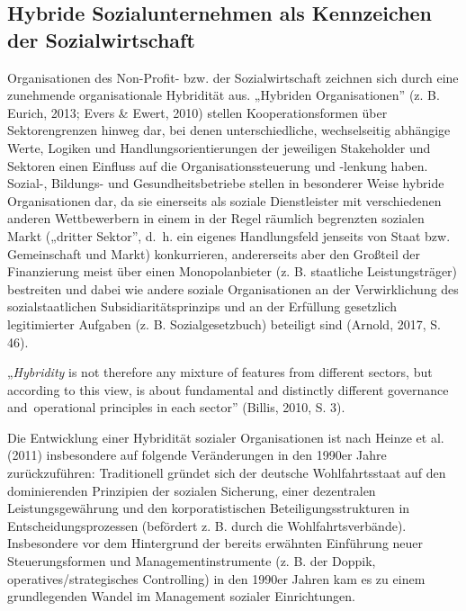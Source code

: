 \documentclass[
  letterpaper,
]{book}
\begin{document}
\subsection{Hybride Sozialunternehmen als Kennzeichen der
Sozialwirtschaft}\label{hybride-sozialunternehmen}

Organisationen des Non-Profit- bzw. der Sozialwirtschaft zeichnen sich
durch eine zunehmende organisationale Hybridität aus. „Hybriden
Organisationen'' (z. B. Eurich, 2013; Evers \& Ewert, 2010) stellen
Kooperationsformen über Sektorengrenzen hinweg dar, bei denen
unterschiedliche, wechselseitig abhängige Werte, Logiken und
Handlungsorientierungen der jeweiligen Stakeholder und Sektoren einen
Einfluss auf die Organisationssteuerung und -lenkung haben. Sozial-,
Bildungs- und Gesundheitsbetriebe stellen in besonderer Weise hybride
Organisationen dar, da sie einerseits als soziale Dienstleister mit
verschiedenen anderen Wettbewerbern in einem in der Regel räumlich
begrenzten sozialen Markt („dritter Sektor'', d.~h. ein eigenes
Handlungsfeld jenseits von Staat bzw. Gemeinschaft und Markt)
konkurrieren, andererseits aber den Großteil der Finanzierung meist über
einen Monopolanbieter (z. B. staatliche Leistungsträger) bestreiten und
dabei wie andere soziale Organisationen an der Verwirklichung des
sozialstaatlichen Subsidiaritätsprinzips und an der Erfüllung gesetzlich
legitimierter Aufgaben (z. B. Sozialgesetzbuch) beteiligt sind (Arnold,
2017, S. 46).

„\emph{Hybridity} is not therefore any mixture of features from
different sectors, but according to this view, is about fundamental and
distinctly different governance and~operational principles in each
sector'' (Billis, 2010, S. 3).

Die Entwicklung einer Hybridität sozialer Organisationen ist nach Heinze
et al. (2011) insbesondere auf folgende Veränderungen in den 1990er
Jahre zurückzuführen: Traditionell gründet sich der deutsche
Wohlfahrtsstaat auf den dominierenden Prinzipien der sozialen Sicherung,
einer dezentralen Leistungsgewährung und den korporatistischen
Beteiligungsstrukturen in Entscheidungsprozessen (befördert z. B. durch
die Wohlfahrtsverbände). Insbesondere vor dem Hintergrund der bereits
erwähnten Einführung neuer Steuerungsformen und Managementinstrumente
(z. B. der Doppik, operatives/strategisches Controlling) in den 1990er
Jahren kam es zu einem grundlegenden Wandel im Management sozialer
Einrichtungen.
\end{document}
